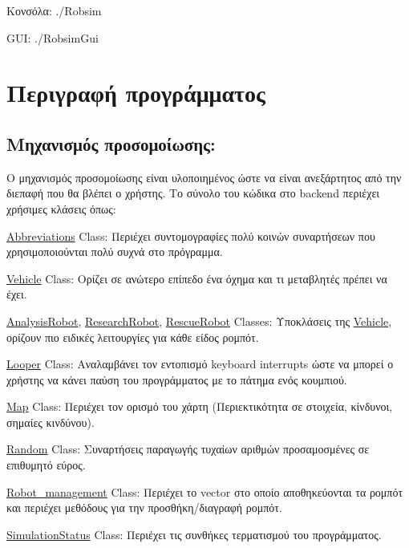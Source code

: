 \begin{center} Κονσόλα\-: ./\-Robsim \end{center}  \begin{center} G\-U\-I\-: ./\-Robsim\-Gui \end{center} \hypertarget{index_desc}{}\section{Περιγραφή προγράμματος}\label{index_desc}
\hypertarget{index_sub0}{}\subsection{Μηχανισμός προσομοίωσης\-:}\label{index_sub0}
Ο μηχανισμός προσομοίωσης είναι υλοποιημένος ώστε να είναι ανεξάρτητος από την διεπαφή που θα βλέπει ο χρήστης. Το σύνολο του κώδικα στο backend περιέχει χρήσιμες κλάσεις όπως\-:

\hyperlink{class_abbreviations}{Abbreviations} Class\-: Περιέχει συντομογραφίες πολύ κοινών συναρτήσεων που χρησιμοποιούνται πολύ συχνά στο πρόγραμμα.

\hyperlink{class_vehicle}{Vehicle} Class\-: Ορίζει σε ανώτερο επίπεδο ένα όχημα και τι μεταβλητές πρέπει να έχει.

\hyperlink{class_analysis_robot}{Analysis\-Robot}, \hyperlink{class_research_robot}{Research\-Robot}, \hyperlink{class_rescue_robot}{Rescue\-Robot} Classes\-: Υποκλάσεις της \hyperlink{class_vehicle}{Vehicle}, ορίζουν πιο ειδικές λειτουργίες για κάθε είδος ρομπότ.

\hyperlink{class_looper}{Looper} Class\-: Αναλαμβάνει τον εντοπισμό keyboard interrupts ώστε να μπορεί ο χρήστης να κάνει παύση του προγράμματος με το πάτημα ενός κουμπιού.

\hyperlink{class_map}{Map} Class\-: Περιέχει τον ορισμό του χάρτη (Περιεκτικότητα σε στοιχεία, κίνδυνοι, σημαίες κινδύνου).

\hyperlink{class_random}{Random} Class\-: Συναρτήσεις παραγωγής τυχαίων αριθμών προσαμοσμένες σε επιθυμητό εύρος.

\hyperlink{class_robot__management}{Robot\-\_\-management} Class\-: Περιέχει το vector στο οποίο αποθηκεύονται τα ρομπότ και περιέχει μεθόδους για την προσθήκη/διαγραφή ρομπότ.

\hyperlink{class_simulation_status}{Simulation\-Status} Class\-: Περιέχει τις συνθήκες τερματισμού του προγράμματος.

